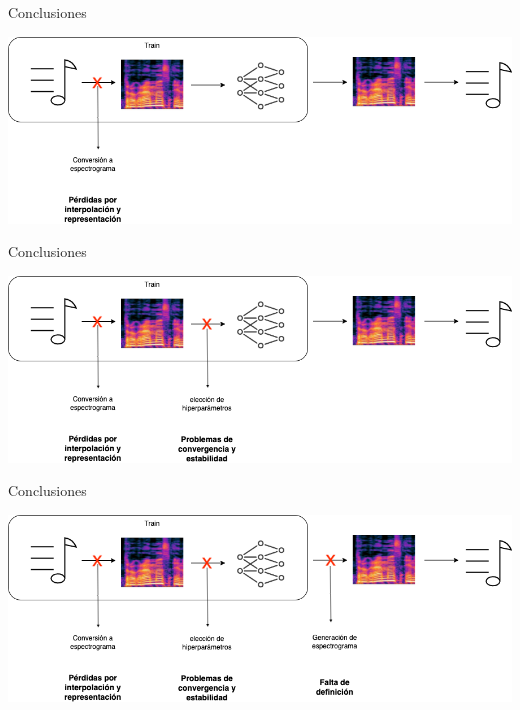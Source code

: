 \documentclass{beamer}
\begin{document}
\begin{frame}{Conclusiones}
  \vspace{0.45cm}
  \begin{center}
  \includegraphics[width=1\textwidth]{images/conversion-fails-1.png}
  \end{center}
\end{frame}

\begin{frame}{Conclusiones}
  \vspace{0.45cm}
  \begin{center}
  \includegraphics[width=1\textwidth]{images/conversion-fails-2.png}
  \end{center}
\end{frame}

\begin{frame}{Conclusiones}
  \vspace{0.45cm}
  \begin{center}
  \includegraphics[width=1\textwidth]{images/conversion-fails-3.png}
  \end{center}
\end{frame}
\end{document}
